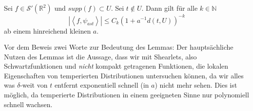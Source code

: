 \begin{lemma}
    \label{lemm:shearlets_decay_quickly_schwartz}
    Sei $f \in \mathcal{S}'(\mathbb{R}^2)$ und $supp(f) \subset U$. Sei $t \notin U$. Dann gilt für alle $k \in \mathbb{N}$
    \begin{equation*}
        |\left\langle f, \psi_{ast}\right\rangle| \leq C_k \left(1+a^{-1} d(t,U)\right)^{-k}
    \end{equation*}
    ab einem hinreichend kleinen $a$.
\end{lemma}

Vor dem Beweis zwei Worte zur Bedeutung des Lemmas: Der hauptsächliche Nutzen des Lemmas ist die Aussage, dass wir mit Shearlets, also Schwartzfunktionen und \emph{nicht} kompakt getragenen Funktionen, die lokalen Eigenschaften von temperierten Distributionen untersuchen können, da wir alles was $\delta$-weit von $t$ entfernt exponentiell schnell (in $a$) nicht mehr sehen. Dies ist möglich, da temperierte Distributionen in einem geeigneten Sinne nur polynomiell schnell wachsen.

